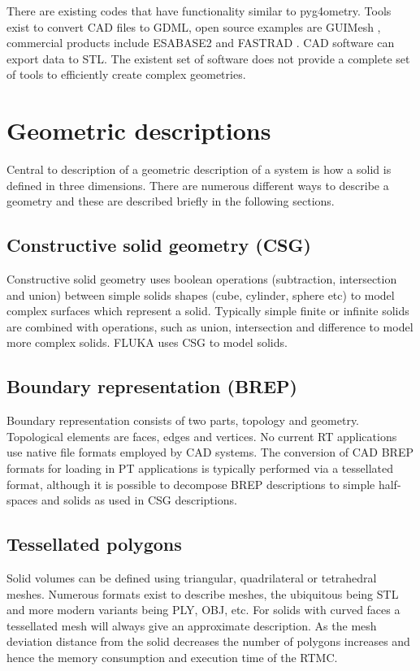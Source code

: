 \documentclass[final,5p,times,twocolumn]{elsarticle}
\begin{document}
There are existing codes that have functionality similar to pyg4ometry. Tools exist to convert CAD files to GDML, open source examples are GUIMesh \cite{GUIMesh_Pinto}, 
commercial products include ESABASE2 \cite{ESABASE2} and FASTRAD \cite{FASTRAD}. 
CAD software can export data to STL. The existent set of software does not provide a complete set of tools to efficiently create complex geometries.   

\section{Geometric descriptions} \label{sec:geometric}
Central to description of a geometric description of a system is how a solid is defined in three dimensions. There are numerous different ways to describe a
geometry and these are described briefly in the following sections.  

\subsection{Constructive solid geometry (CSG)}
Constructive solid geometry uses boolean operations (subtraction, intersection and union) between simple solids shapes (cube, cylinder, sphere etc) to model complex 
surfaces which represent a solid. Typically simple finite or infinite solids are combined with operations, such as union, intersection and difference to model more 
complex solids. FLUKA uses CSG to model solids.

\subsection{Boundary representation (BREP)}
Boundary representation consists of two parts, topology and geometry. Topological elements are faces, edges and vertices. No current RT applications use native 
file formats employed by CAD systems. The conversion of CAD BREP formats for loading in PT applications is typically performed via a tessellated format, although it 
is possible to decompose BREP descriptions to simple half-spaces and solids as used in CSG descriptions. 

\subsection{Tessellated polygons}
Solid volumes can be defined using triangular, quadrilateral or tetrahedral meshes. Numerous formats exist to describe meshes, the ubiquitous being STL and more 
modern variants being PLY, OBJ, etc. For solids with curved faces a tessellated mesh will always give an approximate description. As the mesh deviation distance from the 
solid decreases the number of polygons increases and hence the memory consumption and execution time of the RTMC. 
\end{document}
